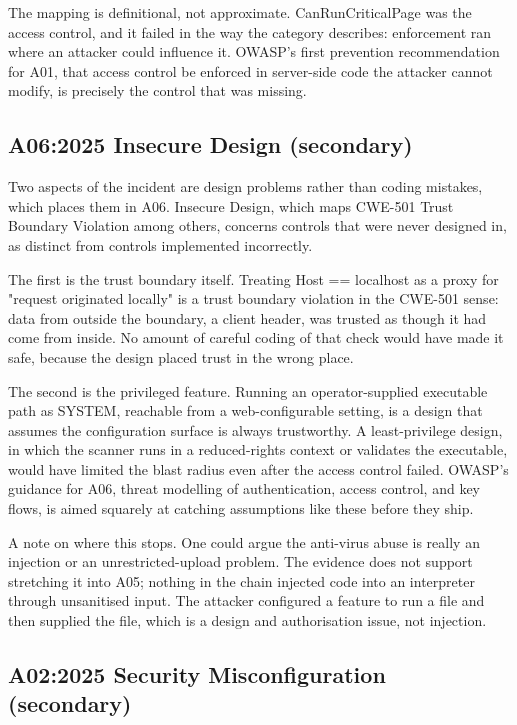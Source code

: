 \documentclass[11pt,a4paper]{article}
\newcommand{\code}[1]{{\small\ttfamily #1}}
\begin{document}
The mapping is definitional, not approximate. CanRunCriticalPage was the access control, and it failed in the way the category describes: enforcement ran where an attacker could influence it. OWASP's first prevention recommendation for A01, that access control be enforced in server-side code the attacker cannot modify, is precisely the control that was missing.

\subsection{A06:2025 Insecure Design (secondary)}

Two aspects of the incident are design problems rather than coding mistakes, which places them in A06. Insecure Design, which maps CWE-501 Trust Boundary Violation among others, concerns controls that were never designed in, as distinct from controls implemented incorrectly.

The first is the trust boundary itself. Treating \code{Host == localhost} as a proxy for "request originated locally" is a trust boundary violation in the CWE-501 sense: data from outside the boundary, a client header, was trusted as though it had come from inside. No amount of careful coding of that check would have made it safe, because the design placed trust in the wrong place.

The second is the privileged feature. Running an operator-supplied executable path as \code{SYSTEM}, reachable from a web-configurable setting, is a design that assumes the configuration surface is always trustworthy. A least-privilege design, in which the scanner runs in a reduced-rights context or validates the executable, would have limited the blast radius even after the access control failed. OWASP's guidance for A06, threat modelling of authentication, access control, and key flows, is aimed squarely at catching assumptions like these before they ship.

A note on where this stops. One could argue the anti-virus abuse is really an injection or an unrestricted-upload problem. The evidence does not support stretching it into A05; nothing in the chain injected code into an interpreter through unsanitised input. The attacker configured a feature to run a file and then supplied the file, which is a design and authorisation issue, not injection.

\subsection{A02:2025 Security Misconfiguration (secondary)}
\end{document}
